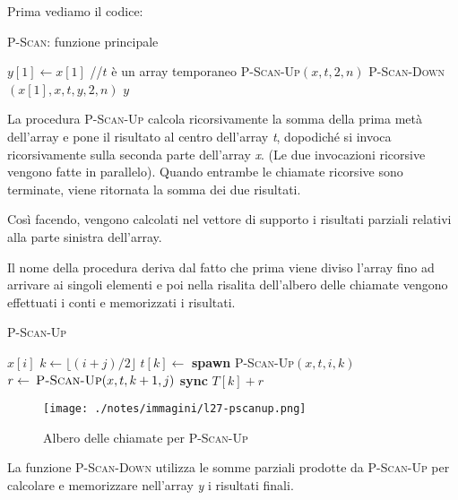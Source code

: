 Prima vediamo il codice:

\begin{breakablealgorithm}
	\caption{\textsc{P-Scan}: funzione principale}
	\begin{algorithmic}[1]
    \State $y[1] \gets x[1]$
        \State //$t$ è un array temporaneo
        \State \textsc{P-Scan-Up}$(x, t, 2, n)$
        \State \textsc{P-Scan-Down}$(x[1], x, t, y, 2, n)$
    \EndIf
    \State \Return $y$
\EndFunction
\end{algorithmic}
\end{breakablealgorithm}

La procedura \textsc{P-Scan-Up} calcola ricorsivamente la somma della prima metà dell'array e pone il risultato al centro dell'array \emph{t}, dopodiché si invoca ricorsivamente sulla seconda parte dell'array \emph{x}. (Le due invocazioni ricorsive vengono fatte in parallelo).
Quando entrambe le chiamate ricorsive sono terminate, viene ritornata la somma dei due risultati.

Così facendo, vengono calcolati nel vettore di supporto i risultati parziali relativi alla parte sinistra dell'array.

Il nome della procedura deriva dal fatto che prima viene diviso l'array fino ad arrivare ai singoli elementi e poi nella risalita dell'albero delle chiamate vengono effettuati i conti e memorizzati i risultati.

\begin{breakablealgorithm}
	\caption{\textsc{P-Scan-Up}}
	\begin{algorithmic}[1]
        \State \Return $ x[i]$
    \EndIf
   \State $k \gets \lfloor (i+j)/2\rfloor$
   \State $t[k] \gets $ \textbf{spawn} \textsc{P-Scan-Up}$(x,t,i,k)$
    \State $r \gets \: \textsc{P-Scan-Up}(x,t,k+1,j)$
    \State \textbf{sync}
    \State \Return $T[k]+r$
\EndFunction
\end{algorithmic}
\end{breakablealgorithm}

\begin{figure}[htbp]
	\centering
	\texttt{[image: ./notes/immagini/l27-pscanup.png]}
	\caption{Albero delle chiamate per \textsc{P-Scan-Up}}
\end{figure}

La funzione \textsc{P-Scan-Down} utilizza le somme parziali prodotte da \textsc{P-Scan-Up} per calcolare e memorizzare nell'array \textit{y} i risultati finali.

